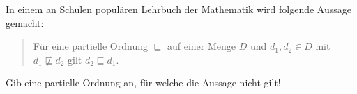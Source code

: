 

\begin{aufgabe}
  In
  einem an Schulen populären Lehrbuch der Mathematik wird folgende
  Aussage gemacht:
  \begin{quote}
    Für eine partielle Ordnung $\sqsubseteq$ auf einer Menge $D$ und
    $d_1,d_2\in D$ mit $d_1 \not\sqsubseteq d_2$ gilt $d_2\sqsubseteq
    d_1$.
  \end{quote}
  Gib eine partielle Ordnung an, für welche die
  Aussage nicht gilt!
\end{aufgabe}

